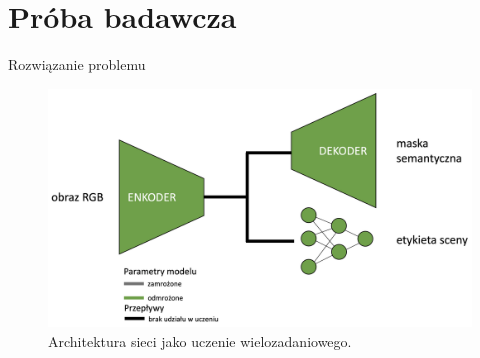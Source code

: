 \documentclass[10pt]{beamer}
\begin{document}
\section*{Próba badawcza}
\begin{frame}{Rozwiązanie problemu}
    \begin{figure}
        \includegraphics[width=\textwidth]{images/fully-unfreezed.png}
        \caption{Architektura sieci jako uczenie wielozadaniowego.}
    \end{figure}
\end{frame}
    
    
    
    
    
\end{document}

